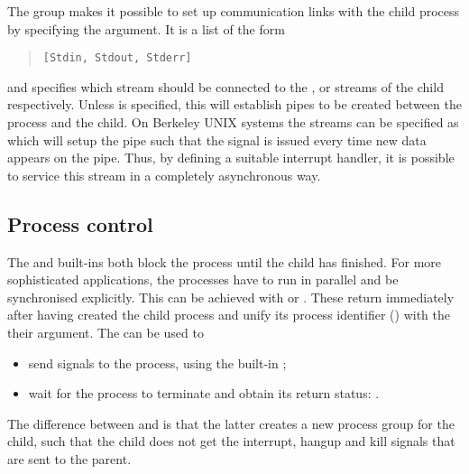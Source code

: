 The  group makes it possible to set up communication links
with the child process by specifying the  argument.
It is a list of the form
\begin{quote}
\begin{verbatim}
[Stdin, Stdout, Stderr]
\end{verbatim}
\end{quote}
and specifies which {\eclipse} stream should be connected to the
,  or  streams of the child
respectively.
Unless  is specified, this will establish pipes to be
created between the {\eclipse} process and the child.
On Berkeley UNIX systems the streams can be specified as
which will setup the pipe such that the signal  is issued
every time new data appears on the pipe.
Thus, by defining a suitable interrupt handler, it is possible to service this
stream in a completely asynchronous way.

\subsection{Process control}
The  and
 built-ins both block the
{\eclipse} process until
the child has finished.
For more sophisticated applications, the processes have to run in parallel
and be synchronised explicitly.
This can be achieved with  or
.
These return immediately after having created the child process and
unify its process identifier () with the their argument.
The  can be used to
\begin{itemize}
\item send signals to the process, using the built-in
  ;
\item wait for the process to terminate and obtain its return status:
  .
\end{itemize}
The difference between  and
 is
that the latter creates a
new process group for the child, such that the child does not get the
interrupt, hangup and kill signals that are sent to the parent.

